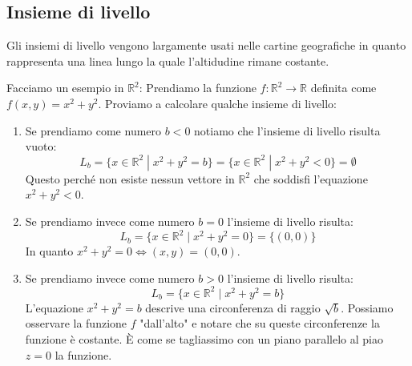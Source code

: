 \subsection{Insieme di livello}
Gli insiemi di livello vengono largamente usati nelle cartine geografiche in 
quanto rappresenta una linea lungo la quale l'altidudine rimane costante. 

Facciamo un esempio in $\mathbb{R}^2$: Prendiamo la funzione $f: \mathbb{R}^2 
\to \mathbb{R}$ definita come $f(x, y) = x^2 + y^2$. Proviamo a calcolare 
qualche insieme di livello:
\begin{enumerate}
	\item Se prendiamo come numero $b < 0$ notiamo che l'insieme di livello 
        risulta vuoto:
		\begin{equation*}
			L_b = \{x \in \mathbb{R}^2 \;|\; x^2 + y^2 = b\} = \{x \in 
            \mathbb{R}^2 \;|\; x^2 + y^2 < 0\} = \emptyset
		\end{equation*}
		Questo perché non esiste nessun vettore in $\mathbb{R}^2$ che soddisfi 
        l'equazione $x^2 + y^2 < 0$.
	
	\item Se prendiamo invece come numero $b = 0$ l'insieme di livello risulta:
		\begin{equation*}
			L_b = \{x \in \mathbb{R}^2 \;|\; x^2 + y^2 = 0\} = \{(0, 0)\}
		\end{equation*}
		In quanto $x^2 + y^2 = 0 \iff (x, y) = (0, 0)$.

	\item Se prendiamo invece come numero $b > 0$ l'insieme di livello risulta:
		\begin{equation*}
			L_b = \{x \in \mathbb{R}^2 \;|\; x^2 + y^2 = b\}
		\end{equation*}
		L'equazione $x^2 + y^2 = b$ descrive una circonferenza di raggio 
        $\sqrt{b}$. Possiamo osservare la funzione $f$ "dall'alto" e notare che 
        su queste circonferenze la funzione è costante. È come se tagliassimo 
        con un piano parallelo al piao $z = 0$ la funzione. %
\end{enumerate}

